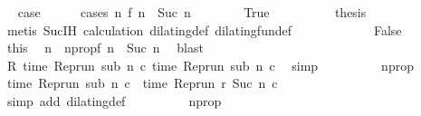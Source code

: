 \begin{isabellebody}
\ \isamarkupfalse%
\ {\isacharquery}case\isanewline
\ \ \ \ \isamarkupfalse%
\ {\isacharparenleft}cases\ {\isacartoucheopen}{\isasymnexists}n\ f\ n\ {\isacharequal}\ Suc\ n{\isacartoucheclose}{\isacharparenright}\isanewline
\ \ \ \ \ \ \isamarkupfalse%
\ True\isanewline
\ \ \ \ \ \ \ \ \isamarkupfalse%
\ {\isacharquery}thesis\ \isamarkupfalse%
\ {\isacharparenleft}metis\ Suc{\isachardot}IH\ calculation\ dilating{\isacharunderscore}def\ dilating{\isacharunderscore}fun{\isacharunderscore}def{\isacharparenright}\isanewline
\ \ \ \ \isamarkupfalse%
\isanewline
\ \ \ \ \ \ \isamarkupfalse%
\ False\isanewline
\ \ \ \ \ \ \isamarkupfalse%
\ this\ \isamarkupfalse%
\ n\ \ nprop{\isacharcolon}{\isacartoucheopen}f\ n\ {\isacharequal}\ Suc\ n{\isacartoucheclose}\ \isamarkupfalse%
\ blast\isanewline
\ \ \ \ \ \ \isamarkupfalse%
\ {}\ \isamarkupfalse%
\ {\isacartoucheopen}R\ {\isacharparenleft}time\ {\isacharparenleft}{\isacharparenleft}Rep{\isacharunderscore}run\ sub{\isacharparenright}\ n\ c\ time\ {\isacharparenleft}{\isacharparenleft}Rep{\isacharunderscore}run\ sub{\isacharparenright}\ n\ c\ \isamarkupfalse%
\ simp\isanewline
\ \ \ \ \ \ \isamarkupfalse%
\ \isamarkupfalse%
\ nprop\ {\isacharasterisk}\ \isamarkupfalse%
\ {\isacartoucheopen}time\ {\isacharparenleft}{\isacharparenleft}Rep{\isacharunderscore}run\ sub{\isacharparenright}\ n\ c\ {\isacharequal}\ time\ {\isacharparenleft}{\isacharparenleft}Rep{\isacharunderscore}run\ r{\isacharparenright}\ {\isacharparenleft}Suc\ n{\isacharparenright}\ c\isanewline
\ \ \ \ \ \ \ \ \isamarkupfalse%
\ {\isacharparenleft}simp\ add{\isacharcolon}\ dilating{\isacharunderscore}def{\isacharparenright}\isanewline
\ \ \ \ \ \ \isamarkupfalse%
\ \isamarkupfalse%
\ nprop\ {\isacharasterisk}\ \isamarkupfalse%

\end{isabellebody}
